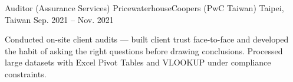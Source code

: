 \begin{cventries}
  \vspace{1mm}

\cventry
  {Auditor (Assurance Services)}
  {PricewaterhouseCoopers (PwC Taiwan)}
  {Taipei, Taiwan}
  {Sep. 2021 -- Nov. 2021}
  {
    \begin{cvitems}
      \item {Conducted on-site client audits — built client trust face-to-face and developed the habit of asking the right questions before drawing conclusions. Processed large datasets with Excel Pivot Tables and VLOOKUP under compliance constraints.}
    \end{cvitems}
  }

\end{cventries}
